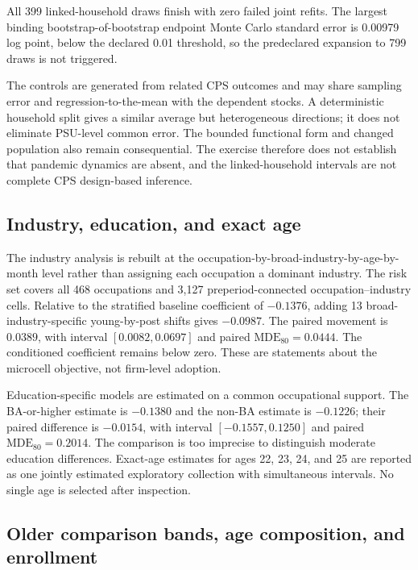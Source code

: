 All 399 linked-household draws finish with zero failed joint refits.  The
largest binding bootstrap-of-bootstrap endpoint Monte Carlo standard error is
0.00979 log point, below the declared 0.01 threshold, so the predeclared
expansion to 799 draws is not triggered.

The controls are generated from related CPS outcomes and may share sampling error and regression-to-the-mean with the dependent stocks.  A deterministic household split gives a similar average but heterogeneous directions; it does not eliminate PSU-level common error.  The bounded functional form and changed population also remain consequential.  The exercise therefore does not establish that pandemic dynamics are absent, and the linked-household intervals are not complete CPS design-based inference.



\subsection{Industry, education, and exact age}

The industry analysis is rebuilt at the occupation-by-broad-industry-by-age-by-month level rather than assigning each occupation a dominant industry.  The risk set covers all 468 occupations and 3,127 preperiod-connected occupation--industry cells.  Relative to the stratified baseline coefficient of $-0.1376$, adding 13 broad-industry-specific young-by-post shifts gives $-0.0987$.  The paired movement is $0.0389$, with interval $[0.0082,0.0697]$ and paired $\mathrm{MDE}_{80}=0.0444$.  The conditioned coefficient remains below zero.  These are statements about the microcell objective, not firm-level adoption.

Education-specific models are estimated on a common occupational support.  The BA-or-higher estimate is $-0.1380$ and the non-BA estimate is $-0.1226$; their paired difference is $-0.0154$, with interval $[-0.1557,0.1250]$ and paired $\mathrm{MDE}_{80}=0.2014$.  The comparison is too imprecise to distinguish moderate education differences.  Exact-age estimates for ages 22, 23, 24, and 25 are reported as one jointly estimated exploratory collection with simultaneous intervals.  No single age is selected after inspection.



\subsection{Older comparison bands, age composition, and enrollment}

